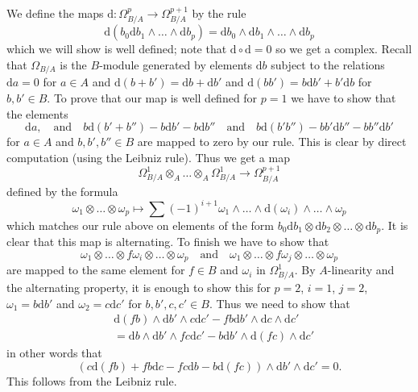 \medskip\noindent
We define the maps $\text{d} : \Omega_{B/A}^p \to \Omega_{B/A}^{p + 1}$
by the rule
$$
\text{d}\left(b_0\text{d}b_1 \wedge \ldots \wedge \text{d}b_p\right) =
\text{d}b_0 \wedge \text{d}b_1 \wedge \ldots \wedge \text{d}b_p
$$
which we will show is well defined; note that
$\text{d} \circ \text{d} = 0$ so we get a complex.
Recall that $\Omega_{B/A}$ is the $B$-module generated by
elements $\text{d}b$ subject to the relations
$\text{d}a = 0$ for $a \in A$ and
$\text{d}(b + b') = \text{d}b + \text{d}b'$ and
$\text{d}(bb') = b\text{d}b' + b'\text{d}b$
for $b, b' \in B$. To prove that our map is well defined for $p = 1$
we have to show that the elements
$$
\text{d}a,
\quad\text{and}\quad
b\text{d}(b' + b'') - b\text{d}b' - b\text{d}b''
\quad\text{and}\quad
b\text{d}(b'b'') - bb'\text{d}b'' - bb''\text{d}b'
$$
for $a \in A$ and  $b, b', b'' \in B$ are mapped to zero by our rule.
This is clear by direct computation (using the Leibniz rule).
Thus we get a map
$$
\Omega^1_{B/A} \otimes_A \ldots \otimes_A \Omega^1_{B/A}
\longrightarrow
\Omega_{B/A}^{p + 1}
$$
defined by the formula
$$
\omega_1 \otimes \ldots \otimes \omega_p
\longmapsto
\sum (-1)^{i + 1}
\omega_1 \wedge \ldots \wedge \text{d}(\omega_i) \wedge \ldots \wedge \omega_p
$$
which matches our rule above on elements of the form
$b_0\text{d}b_1 \otimes \text{d}b_2 \otimes \ldots \otimes \text{d}b_p$.
It is clear that this map is alternating. To finish we have to show
that
$$
\omega_1 \otimes \ldots \otimes f\omega_i \otimes \ldots \otimes \omega_p
\quad\text{and}\quad
\omega_1 \otimes \ldots \otimes f\omega_j \otimes \ldots \otimes \omega_p
$$
are mapped to the same element for $f \in B$ and
$\omega_i$ in $\Omega^1_{B/A}$. By $A$-linearity and
the alternating property, it is enough to show this for $p = 2$, $i = 1$,
$j = 2$, $\omega_1 = b \text{d}b'$ and $\omega_2 = c \text{d} c'$
for $b, b', c, c' \in B$.
Thus we need to show that
\begin{align*}
& \text{d}(fb) \wedge \text{d}b' \wedge c \text{d}c'
- fb \text{d}b' \wedge \text{d}c \wedge \text{d}c' \\
& =
\text{d}b \wedge \text{d}b' \wedge fc\text{d}c'
- b \text{d}b' \wedge \text{d}(fc) \wedge \text{d}c'
\end{align*}
in other words that
$$
(c \text{d}(fb) + fb \text{d}c - fc \text{d}b - b \text{d}(fc))
\wedge \text{d}b' \wedge \text{d}c' = 0.
$$
This follows from the Leibniz rule.

